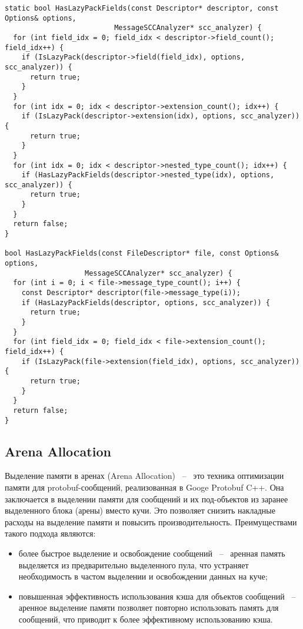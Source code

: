\noindent\begin{minipage}{\linewidth}
\begin{lstlisting}[style=CodeListing, label=sec_impl:code:has_lazy_pack, caption={Функции для определения опции lazy\_pack у полей сообщения}]
static bool HasLazyPackFields(const Descriptor* descriptor, const Options& options,
                          MessageSCCAnalyzer* scc_analyzer) {
  for (int field_idx = 0; field_idx < descriptor->field_count(); field_idx++) {
    if (IsLazyPack(descriptor->field(field_idx), options, scc_analyzer)) {
      return true;
    }
  }
  for (int idx = 0; idx < descriptor->extension_count(); idx++) {
    if (IsLazyPack(descriptor->extension(idx), options, scc_analyzer)) {
      return true;
    }
  }
  for (int idx = 0; idx < descriptor->nested_type_count(); idx++) {
    if (HasLazyPackFields(descriptor->nested_type(idx), options, scc_analyzer)) {
      return true;
    }
  }
  return false;
}

bool HasLazyPackFields(const FileDescriptor* file, const Options& options,
                   MessageSCCAnalyzer* scc_analyzer) {
  for (int i = 0; i < file->message_type_count(); i++) {
    const Descriptor* descriptor(file->message_type(i));
    if (HasLazyPackFields(descriptor, options, scc_analyzer)) {
      return true;
    }
  }
  for (int field_idx = 0; field_idx < file->extension_count(); field_idx++) {
    if (IsLazyPack(file->extension(field_idx), options, scc_analyzer)) {
      return true;
    }
  }
  return false;
}

\end{lstlisting}
\end{minipage}

\subsection{Arena Allocation}

Выделение памяти в аренах (Arena Allocation) ~--~ это техника оптимизации памяти для protobuf-сообщений, реализованная в Googe Protobuf C++. 
Она заключается в выделении памяти для сообщений и их под-объектов из заранее выделенного блока (арены) вместо кучи.
Это позволяет снизить накладные расходы на выделение памяти и повысить производительность.
\pagebreak
Преимуществами такого подхода являются:
\begin{itemize}
    \item более быстрое выделение и освобождение сообщений ~--~ аренная память выделяется из предварительно выделенного пула, что устраняет необходимость в частом выделении и освобождении данных на куче;
    \item повышенная эффективность использования кэша для объектов сообщений ~--~ аренное выделение памяти позволяет повторно использовать память для сообщений, что приводит к более эффективному использованию кэша.
\end{itemize}

